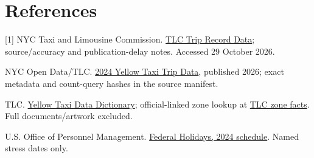 \documentclass[11pt]{article}
\begin{document}
\section*{References}
\small
[1] NYC Taxi and Limousine Commission. \href{https://www.nyc.gov/site/tlc/about/tlc-trip-record-data.page}{TLC Trip Record Data}; source/accuracy and publication-delay notes. Accessed 29 October 2026.\par
[2] NYC Open Data/TLC. \href{https://data.cityofnewyork.us/Transportation/2024-Yellow-Taxi-Trip-Data/rwwi-khbc}{2024 Yellow Taxi Trip Data}, published 2026; exact metadata and count-query hashes in the source manifest.\par
[3] TLC. \href{https://www.nyc.gov/assets/tlc/downloads/pdf/data_dictionary_trip_records_yellow.pdf}{Yellow Taxi Data Dictionary}; official-linked zone lookup at \href{https://d37ci6vzurychx.cloudfront.net/misc/taxi_zone_lookup.csv}{TLC zone facts}. Full documents/artwork excluded.\par
[4] U.S. Office of Personnel Management. \href{https://www.opm.gov/policy-data-oversight/pay-leave/federal-holidays/}{Federal Holidays, 2024 schedule}. Named stress dates only.
\end{document}
